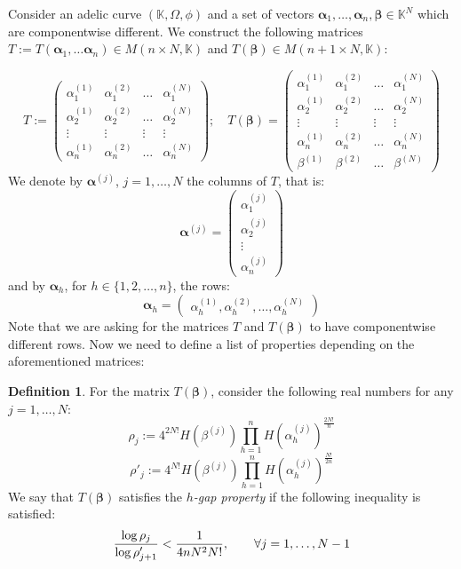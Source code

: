 \documentclass[10 pt,a4paper]{article}
\theoremstyle{plain}
\theoremstyle{definition}
\newtheorem{defn}[thm]{Definition}
\theoremstyle{named}
\begin{document}
Consider an adelic curve $(\mathbb K,\Omega, \phi)$ and a set of vectors $\bm{\alpha}_1,\ldots,\bm{\alpha}_n,\bm{\beta}\in\mathbb K^N$ which are componentwise different. We construct the following  matrices $T:=T(\bm{\alpha}_1,\ldots\bm{\alpha}_n)\in M(n\times N,\mathbb K)$ and $T(\bm{\beta})\in M(n+1\times N,\mathbb K)$:


\[
T:=\begin{pmatrix}
 \alpha^{(1)}_1& \alpha^{(2)}_1  &\ldots &\alpha^{(N)}_1 \\
 \alpha^{(1)}_2& \alpha^{(2)}_2  &\ldots &\alpha^{(N)}_2\\
\vdots & \vdots & \vdots & \vdots\\
\alpha^{(1)}_n& \alpha^{(2)}_n  &\ldots &\alpha^{(N)}_n
\end{pmatrix};\quad
T(\bm{\beta})=\begin{pmatrix}
 \alpha^{(1)}_1& \alpha^{(2)}_1  &\ldots &\alpha^{(N)}_1 \\
 \alpha^{(1)}_2& \alpha^{(2)}_2  &\ldots &\alpha^{(N)}_2\\
\vdots & \vdots  & \vdots  &\vdots\\
\alpha^{(1)}_n& \alpha^{(2)}_n  &\ldots &\alpha^{(N)}_n\\
\beta^{(1)}& \beta^{(2)}  &\ldots &\beta^{(N)}
\end{pmatrix}
\]
We denote by $\bm{\alpha}^{(j)}$, $j=1,\ldots, N$ the columns of $T$, that is:
\begin{equation*}
\bm{\alpha}^{(j)}=\begin{pmatrix}
 \alpha^{(j)}_1 \\
 \alpha^{(j)}_2\\
\vdots \\
\alpha^{(j)}_n
\end{pmatrix}
\end{equation*} 
and by $\bm{\alpha}_{h}$, for  $h\in\{1,2,\dots ,n\}$, the rows:
\begin{equation*}
\bm{\alpha}_{h}=\begin{pmatrix}
 \mathbb \alpha^{(1)}_h, \alpha^{(2)}_h,\ldots, \alpha^{(N)}_h
 \end{pmatrix}
\end{equation*}
Note that we are asking for the matrices $T$ and $T(\bm{\beta})$ to have componentwise different rows. Now we need to define a list of properties depending on the aforementioned matrices:
\begin{defn}\label{boxing}
For the matrix $T(\bm{\beta})$, consider the following real numbers for any $j=1,\ldots, N$: 
\begin{equation}\label{pivot}
\rho_{j}:=4^{2N!}H(\beta^{(j)})\prod_{h=1}^{n}H(\alpha_h^{(j)})^{\frac{2N!}{n}}
\end{equation}
\begin{equation}\label{pivotdue}
\rho'_{j}:=4^{N!}H(\beta^{(j)})\prod_{h=1}^{n}H(\alpha_h^{(j)})^{\frac{N!}{2n}}
\end{equation}
We say that $T(\bm{\beta})$ satisfies the \emph{$h$-gap property} if the following inequality is satisfied:
$$
\frac{{\rm{log}}\, \rho_j }{{\rm{log}}\,\rho'_{j+1}}<\frac{1}{4nN^2N!},\qquad \forall j=1,\ldots, N-1
$$
\end{defn}
\end{document}
